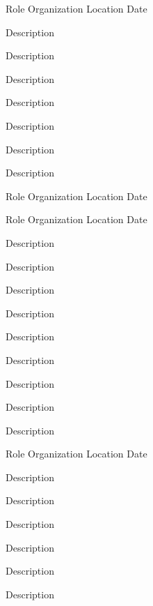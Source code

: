 

\begin{cventries}

  \cventry
    {Role} %
    {Organization} %
    {Location} %
    {Date} %
    {
      \begin{cvitems} %
        \item {Description}
        \item {Description}
        \item {Description}
        \item {Description}
        \item {Description}
        \item {Description}
        \item {Description}
      \end{cvitems}
    }

  \cventry
    {Role} %
    {Organization} %
    {Location} %
    {Date} %
    {
    }

  \cventry
    {Role} %
    {Organization} %
    {Location} %
    {Date} %
    {
      \begin{cvitems} %
        \item {Description}
        \item {Description}
        \item {Description}
        \item {Description}
        \item {Description}
        \item {Description}
        \item {Description}
        \item {Description}
        \item {Description}
      \end{cvitems}
    }

  \cventry
    {Role} %
    {Organization} %
    {Location} %
    {Date} %
    {
      \begin{cvitems} %
        \item {Description}
        \item {Description}
        \item {Description}
        \item {Description}
        \item {Description}
        \item {Description}
      \end{cvitems}
    }


\end{cventries}
